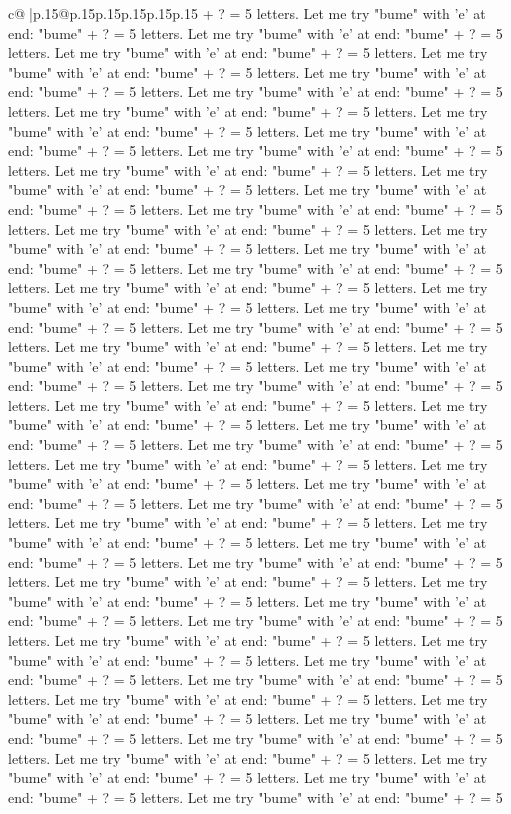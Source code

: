 \documentclass{article}
\begin{document}
{\begin{supertabular}{c@{$\;$}|p{.15\linewidth}@{}p{.15\linewidth}p{.15\linewidth}p{.15\linewidth}p{.15\linewidth}p{.15\linewidth}}
{{{+ ? = 5 letters. Let me try "bume" with 'e' at end: "bume" + ? = 5 letters. Let me try "bume" with 'e' at end: "bume" + ? = 5 letters. Let me try "bume" with 'e' at end: "bume" + ? = 5 letters. Let me try "bume" with 'e' at end: "bume" + ? = 5 letters. Let me try "bume" with 'e' at end: "bume" + ? = 5 letters. Let me try "bume" with 'e' at end: "bume" + ? = 5 letters. Let me try "bume" with 'e' at end: "bume" + ? = 5 letters. Let me try "bume" with 'e' at end: "bume" + ? = 5 letters. Let me try "bume" with 'e' at end: "bume" + ? = 5 letters. Let me try "bume" with 'e' at end: "bume" + ? = 5 letters. Let me try "bume" with 'e' at end: "bume" + ? = 5 letters. Let me try "bume" with 'e' at end: "bume" + ? = 5 letters. Let me try "bume" with 'e' at end: "bume" + ? = 5 letters. Let me try "bume" with 'e' at end: "bume" + ? = 5 letters. Let me try "bume" with 'e' at end: "bume" + ? = 5 letters. Let me try "bume" with 'e' at end: "bume" + ? = 5 letters. Let me try "bume" with 'e' at end: "bume" + ? = 5 letters. Let me try "bume" with 'e' at end: "bume" + ? = 5 letters. Let me try "bume" with 'e' at end: "bume" + ? = 5 letters. Let me try "bume" with 'e' at end: "bume" + ? = 5 letters. Let me try "bume" with 'e' at end: "bume" + ? = 5 letters. Let me try "bume" with 'e' at end: "bume" + ? = 5 letters. Let me try "bume" with 'e' at end: "bume" + ? = 5 letters. Let me try "bume" with 'e' at end: "bume" + ? = 5 letters. Let me try "bume" with 'e' at end: "bume" + ? = 5 letters. Let me try "bume" with 'e' at end: "bume" + ? = 5 letters. Let me try "bume" with 'e' at end: "bume" + ? = 5 letters. Let me try "bume" with 'e' at end: "bume" + ? = 5 letters. Let me try "bume" with 'e' at end: "bume" + ? = 5 letters. Let me try "bume" with 'e' at end: "bume" + ? = 5 letters. Let me try "bume" with 'e' at end: "bume" + ? = 5 letters. Let me try "bume" with 'e' at end: "bume" + ? = 5 letters. Let me try "bume" with 'e' at end: "bume" + ? = 5 letters. Let me try "bume" with 'e' at end: "bume" + ? = 5 letters. Let me try "bume" with 'e' at end: "bume" + ? = 5 letters. Let me try "bume" with 'e' at end: "bume" + ? = 5 letters. Let me try "bume" with 'e' at end: "bume" + ? = 5 letters. Let me try "bume" with 'e' at end: "bume" + ? = 5 letters. Let me try "bume" with 'e' at end: "bume" + ? = 5 letters. Let me try "bume" with 'e' at end: "bume" + ? = 5 letters. Let me try "bume" with 'e' at end: "bume" + ? = 5 letters. Let me try "bume" with 'e' at end: "bume" + ? = 5 letters. Let me try "bume" with 'e' at end: "bume" + ? = 5 letters. Let me try "bume" with 'e' at end: "bume" + ? = 5 letters. Let me try "bume" with 'e' at end: "bume" + ? = 5 letters. Let me try "bume" with 'e' at end: "bume" + ? = 5 letters. Let me try "bume" with 'e' at end: "bume" + ? = 5 letters. Let me try "bume" with 'e' at end: "bume" + ? = 5 letters. Let me try "bume" with 'e' at end: "bume" + ? = 5 letters. Let me try "bume" with 'e' at end: "bume" + ? = 5 letters. Let me try "bume" with 'e' at end: "bume" + ? = 5 letters. Let me try "bume" with 'e' at end: "bume" + ? = 5 letters. Let me try "bume" with 'e' at end: "bume" + ? = 5 letters. Let me try "bume" with 'e' at end: "bume" + ? = 5 }}}
\end{supertabular}}
\end{document}
